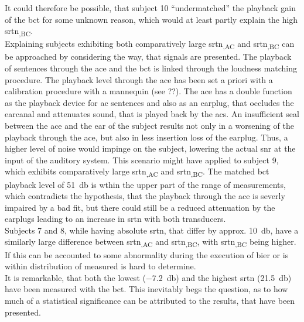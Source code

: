 It could therefore be possible, that subject 10 \enquote{undermatched} the playback gain of the \gls{bct} for some unknown reason, which would at least partly explain the high \gls{srtn}\textsubscript{,BC}.\\
Explaining subjects exhibiting both comparatively large \gls{srtn}\textsubscript{,AC} and \gls{srtn}\textsubscript{,BC} can be approached by considering the way, that signals are presented.
The playback of sentences through the \gls{ace} and the \gls{bct} is linked through the loudness matching procedure. The playback level through the \gls{ace} has been set a priori with a calibration procedure with a mannequin (see ??). The \gls{ace} has a double function as the playback device for \gls{ac} sentences and also as an earplug, that occludes the earcanal and attenuates sound, that is played back by the \gls{acs}.
An insufficient seal between the \gls{ace} and the ear of the subject results not only in a worsening of the playback through the \gls{ace}, but also in less insertion loss of the earplug. Thus, a higher level of noise would impinge on the subject, lowering the actual \gls{snr} at the input of the auditory system.
This scenario might have applied to subject 9, which exhibits comparatively large \gls{srtn}\textsubscript{,AC} and \gls{srtn}\textsubscript{,BC}. 
The matched \gls{bct} playback level of \SI{51}{\decibel} is wthin the upper part of the range of measurements, which contradicts the hypothesis, that the playback through the \gls{ace} is severly impaired by a bad fit, but there could still be a reduced attenuation by the earplugs leading to an increase in \gls{srtn} with both transducers.\\
Subjects 7 and 8, while having absolute \gls{srtn}, that differ by approx. \SI{10}{\decibel}, have a similarly large difference between \gls{srtn}\textsubscript{,AC} and \gls{srtn}\textsubscript{,BC}, with \gls{srtn}\textsubscript{,BC} being higher.
If this can be accounted to some abnormality during the execution of \gls{bier} or is within distribution of measured is hard to determine.\\
It is remarkable, that both the lowest (\SI{-7.2}{\decibel}) and the highest \gls{srtn} (\SI{21.5}{\decibel}) have been measured with the \gls{bct}.
This inevitably begs the question, as to how much of a statistical significance can be attributed to the results, that have been presented.\\

